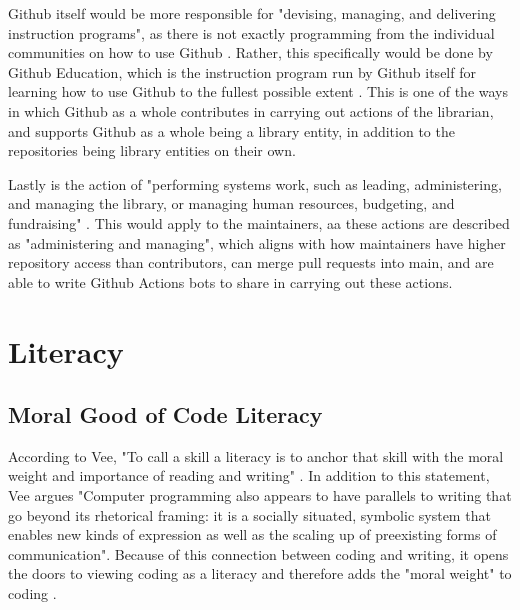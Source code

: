 Github itself would be more responsible for "devising, managing, and delivering instruction programs", as there is not exactly programming from the individual communities on how to use Github \cite{gorman2000values}. Rather, this specifically would be done by Github Education, which is the instruction program run by Github itself for learning how to use Github to the fullest possible extent \cite{githubedu}. This is one of the ways in which Github as a whole contributes in carrying out actions of the librarian, and supports Github as a whole being a library entity, in addition to the repositories being library entities on their own. 

Lastly is the action of "performing systems work, such as leading, administering, and managing the library, or managing human resources, budgeting, and fundraising" \cite{gorman2000values}. This would apply to the maintainers, aa these actions are described as "administering and managing", which aligns with how maintainers have higher repository access than contributors, can merge pull requests into main, and are able to write Github Actions bots to share in carrying out these actions. 

\section{Literacy}
\label{sec:literacy}

\subsection{Moral Good of Code Literacy}

According to Vee, "To call a skill a literacy is to anchor that skill with the moral weight and importance of reading and writing" \cite{vee2017coding}. In addition to this statement, Vee argues "Computer programming also appears to have parallels to writing that go beyond its rhetorical framing: it is a socially situated, symbolic system that enables new kinds of expression as well as the scaling up of preexisting forms of communication"\cite{vee2017coding}. Because of this connection between coding and writing, it opens the doors to viewing coding as a literacy and therefore adds the "moral weight" to coding \cite{vee2017coding}. 

